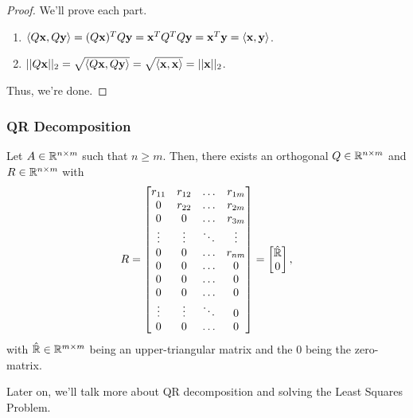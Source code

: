 \documentclass[letterpaper]{article}
\newcommand{\0}{\mathbf{0}}
\newcommand{\y}{\mathbf{y}}
\newcommand{\x}{\mathbf{x}}
\begin{document}
\begin{proof}
    We'll prove each part. 
    \begin{enumerate}
        \item $\cyclic{Q\x, Q\y} = (Q\x)^T Q\y = \x^T Q^T Q \y = \x^T \y = \cyclic{\x, \y}$. 
        \item $||Q\x||_2 = \sqrt{\cyclic{Q\x, Q\y}} = \sqrt{\cyclic{\x, \x}} = ||\x||_2$. 
    \end{enumerate}
    Thus, we're done.
\end{proof}

\subsubsection{QR Decomposition}
\begin{theorem}{}{}
    Let $A \in \mathbb{R}^{n \times m}$ such that $n \geq m$. Then, there exists an orthogonal $Q \in \mathbb{R}^{n \times m}$ and $R \in \mathbb{R}^{n \times m}$ with 
    \[R = \begin{bmatrix}
        r_{11} & r_{12} & \hdots & r_{1m} \\ 
        0 & r_{22} & \hdots & r_{2m} \\
        0 & 0 & \hdots & r_{3m} \\ 
        \vdots & \vdots & \ddots & \vdots \\ 
        0 & 0 & \hdots & r_{nm} \\ 
        0 & 0 & \hdots & 0 \\ 
        0 & 0 & \hdots & 0 \\ 
        0 & 0 & \hdots & 0 \\ 
        \vdots & \vdots & \ddots & 0 \\ 
        0 & 0 & \hdots & 0
    \end{bmatrix} = \begin{bmatrix}
        \hat{\mathbb{R}} \\ 0
    \end{bmatrix},\]
    with $\hat{\mathbb{R}} \in \mathbb{R}^{m \times m}$ being an upper-triangular matrix and the 0 being the zero-matrix.
\end{theorem}
Later on, we'll talk more about QR decomposition and solving the Least Squares Problem.
\end{document}
